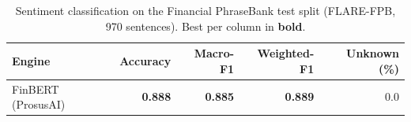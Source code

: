 \begin{table}[t]
  \centering
  \caption{Sentiment classification on the Financial PhraseBank test split (FLARE-FPB, 970 sentences). Best per column in \textbf{bold}.}
  \label{tab:sentiment}
  \begin{tabular}{lrrrr}
    \toprule
    Engine & Accuracy & Macro-F1 & Weighted-F1 & Unknown (\%) \\
    \midrule
    FinBERT (ProsusAI) & \textbf{0.888} & \textbf{0.885} & \textbf{0.889} & 0.0 \\
    \bottomrule
  \end{tabular}
\end{table}
